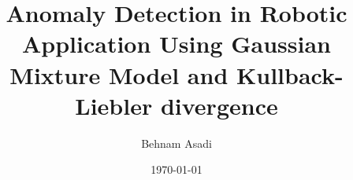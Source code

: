 \documentclass{article}
\begin{document}
\setlength{\parindent}{0in}%
\author{Behnam Asadi}
\title{Anomaly Detection in Robotic Application Using Gaussian Mixture Model and Kullback-Liebler divergence}
\date{\today}
\maketitle
%
\end{document}
